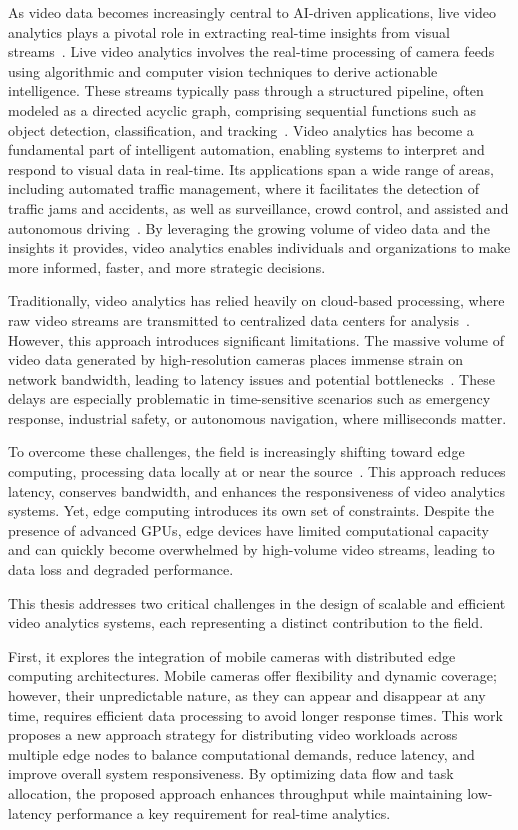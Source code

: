 As video data becomes increasingly central to AI-driven applications, live video analytics plays a pivotal role in extracting real-time insights from visual streams~\cite{}. Live video analytics involves the real-time processing of camera feeds using algorithmic and computer vision techniques to derive actionable intelligence. These streams typically pass through a structured pipeline, often modeled as a directed acyclic graph, comprising sequential functions such as object detection, classification, and tracking~\cite{}. Video analytics has become a fundamental part of intelligent automation, enabling systems to interpret and respond to visual data in real-time. Its applications span a wide range of areas, including automated traffic management, where it facilitates the detection of traffic jams and accidents, as well as surveillance, crowd control, and assisted and autonomous driving~\cite{}. By leveraging the growing volume of video data and the insights it provides, video analytics enables individuals and organizations to make more informed, faster, and more strategic decisions.

Traditionally, video analytics has relied heavily on cloud-based processing, where raw video streams are transmitted to centralized data centers for analysis~\cite{}. However, this approach introduces significant limitations. The massive volume of video data generated by high-resolution cameras places immense strain on network bandwidth, leading to latency issues and potential bottlenecks~\cite{}. These delays are especially problematic in time-sensitive scenarios such as emergency response, industrial safety, or autonomous navigation, where milliseconds matter.

To overcome these challenges, the field is increasingly shifting toward edge computing, processing data locally at or near the source~\cite{}. This approach reduces latency, conserves bandwidth, and enhances the responsiveness of video analytics systems. Yet, edge computing introduces its own set of constraints. Despite the presence of advanced GPUs, edge devices have limited computational capacity and can quickly become overwhelmed by high-volume video streams, leading to data loss and degraded performance.

This thesis addresses two critical challenges in the design of scalable and efficient video analytics systems, each representing a distinct contribution to the field.

First, it explores the integration of mobile cameras with distributed edge computing architectures. Mobile cameras offer flexibility and dynamic coverage; however, their unpredictable nature, as they can appear and disappear at any time, requires efficient data processing to avoid longer response times. This work proposes a new approach strategy for distributing video workloads across multiple edge nodes to balance computational demands, reduce latency, and improve overall system responsiveness. By optimizing data flow and task allocation, the proposed approach enhances throughput while maintaining low-latency performance a key requirement for real-time analytics.

